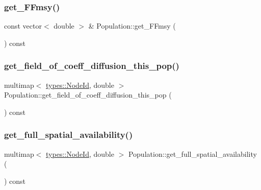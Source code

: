 \mbox{\label{class_population_a5796212d35e49684c3a9f8ae230e881d}} 
\subsubsection{\texorpdfstring{get\_FFmsy()}{get\_FFmsy()}}
{\footnotesize\ttfamily const vector$<$ double $>$ \& Population\+::get\+\_\+\+F\+Fmsy (\begin{DoxyParamCaption}{ }\end{DoxyParamCaption}) const}

\mbox{\label{class_population_ac19b4f16a221c1a72c18f34ffa5a4b45}} 
\subsubsection{\texorpdfstring{get\_field\_of\_coeff\_diffusion\_this\_pop()}{get\_field\_of\_coeff\_diffusion\_this\_pop()}}
{\footnotesize\ttfamily multimap$<$ \mbox{\hyperlink{classtypes_1_1_node_id}{types\+::\+Node\+Id}}, double $>$ Population\+::get\+\_\+field\+\_\+of\+\_\+coeff\+\_\+diffusion\+\_\+this\+\_\+pop (\begin{DoxyParamCaption}{ }\end{DoxyParamCaption}) const}

\mbox{\label{class_population_a9d785272507fa047776832df0e78199a}} 
\subsubsection{\texorpdfstring{get\_full\_spatial\_availability()}{get\_full\_spatial\_availability()}}
{\footnotesize\ttfamily multimap$<$ \mbox{\hyperlink{classtypes_1_1_node_id}{types\+::\+Node\+Id}}, double $>$ Population\+::get\+\_\+full\+\_\+spatial\+\_\+availability (\begin{DoxyParamCaption}{ }\end{DoxyParamCaption}) const}

